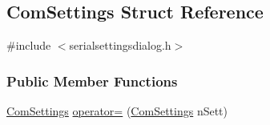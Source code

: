 \hypertarget{structComSettings}{}\subsection{Com\+Settings Struct Reference}
\label{structComSettings}


{\ttfamily \#include $<$serialsettingsdialog.\+h$>$}

\subsubsection*{Public Member Functions}
\begin{DoxyCompactItemize}
\item 
\mbox{\hyperlink{structComSettings}{Com\+Settings}} \mbox{\hyperlink{structComSettings_ab648b02bb8d54eaa75afde8af0bb4218}{operator=}} (\mbox{\hyperlink{structComSettings}{Com\+Settings}} n\+Sett)
\end{DoxyCompactItemize}
